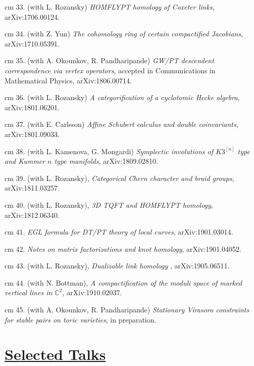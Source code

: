 \documentclass[11pt]{amsart}
\theoremstyle{plain}
\theoremstyle{definition}
\theoremstyle{remark}
\begin{document}
\noindent{} cm 33. (with L. Rozansky) {\it HOMFLYPT homology of Coxeter links},  arXiv:1706.00124.




\noindent{} cm 34. (with  Z. Yun) {\it The cohomology ring of certain compactified Jacobians},  arXiv:1710.05391. 


\noindent{} cm 35. (with A. Okounkov, R. Pandharipande) {\it  GW/PT descendent correspondence via vertex operators},
accepted in Communications in Mathematical Physics, arXiv:1806.00714.



\noindent{} cm 36. (with L. Rozansky)
{\it A categorification of a cyclotomic Hecke algebra}, arXiv:1801.06201.

\noindent{} cm 37. (with E. Carlsson)
{\it Affine Schubert calculus and double coinvariants}, arXiv:1801.09033.

\noindent{} cm 38. (with L. Kamenova, G. Mongardi) {\it Symplectic involutions of \(K3^{[n]}\) type and Kummer \(n\)
  type manifolds}, arXiv:1809.02810.

\noindent{} cm 39. (with L. Rozansky), {\it Categorical Chern character and braid groups}, arXiv:1811.03257.

\noindent{} cm 40. (with L. Rozansky), {\it 3D TQFT and HOMFLYPT homology}, arXiv:1812.06340.

\noindent{} cm 41. {\it EGL formula for DT/PT theory of local curves}, arXiv:1901.03014.

\noindent{} cm 42. {\it Notes on matrix factorizations and knot homology}, arXiv:1901.04052.

\noindent{} cm 43. (with L. Rozansky), {\it Dualizable link homology }, arXiv:1905.06511.

\noindent{} cm 44. (with N. Bottman), {\it 
A compactification of the moduli space of marked vertical lines in $\mathbb{C}^2$, } arXiv:1910.02037.



\noindent{} cm 45. (with A. Okounkov, R. Pandharipande)
{\it  Stationary Virasoro constraints for stable pairs on toric varieties}, in preparation.








\section*{\Large\underline{ Selected Talks}}
\end{document}
